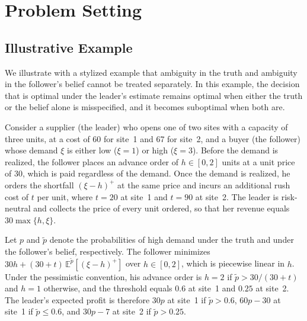 \documentclass[ijoc,dblanonrev]{informs4}
\begin{document}
\setcounter{section}{1}
\section{Problem Setting}
\subsection{Illustrative Example}
\label{subsec:example}

We illustrate with a stylized example that ambiguity in the truth and
ambiguity in the follower's belief cannot be treated separately. In this
example, the decision that is optimal under the leader's estimate remains
optimal when either the truth or the belief alone is misspecified, and it
becomes suboptimal when both are.

Consider a supplier (the leader) who opens one of two sites with a capacity of
three units, at a cost of 60 for site~1 and 67 for site~2, and a buyer (the
follower) whose demand $\xi$ is either low ($\xi = 1$) or high ($\xi = 3$).
Before the demand is realized, the follower places an advance order of
$h \in [0,2]$ units at a unit price of 30, which is paid regardless of the
demand. Once the demand is realized, he orders the shortfall $(\xi - h)^{+}$
at the same price and incurs an additional rush cost of $t$ per unit, where
$t = 20$ at site~1 and $t = 90$ at site~2. The leader is risk-neutral and
collects the price of every unit ordered, so that her revenue equals
$30\max\{h, \xi\}$.

Let $p$ and $\tilde p$ denote the probabilities of high demand under the truth
and under the follower's belief, respectively. The follower minimizes
$30h + (30 + t)\,\mathbb{E}^{\tilde p}[(\xi - h)^{+}]$ over $h \in [0,2]$,
which is piecewise linear in $h$. Under the pessimistic convention, his
advance order is $h = 2$ if $\tilde p > 30/(30 + t)$ and $h = 1$ otherwise,
and the threshold equals $0.6$ at site~1 and $0.25$ at site~2. The leader's
expected profit is therefore $30p$ at site~1 if $\tilde p > 0.6$, $60p - 30$
at site~1 if $\tilde p \le 0.6$, and $30p - 7$ at site~2 if $\tilde p > 0.25$.
\end{document}
